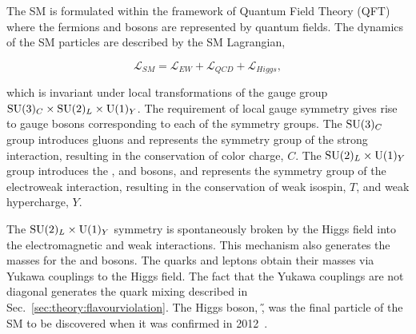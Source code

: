 The SM is formulated within the framework of Quantum Field Theory (QFT) where the fermions and bosons are represented by quantum fields. The dynamics of the SM particles are described by the SM Lagrangian,

\begin{equation}
\mathcal{L}_{SM} = \mathcal{L}_{EW} + \mathcal{L}_{QCD} + \mathcal{L}_{Higgs},
\end{equation}

\noindent which is invariant under local transformations of the gauge group ${\rm SU}(3)_{C} \times {\rm SU}(2)_{L} \times {\rm U}(1)_{Y}$. The requirement of local gauge symmetry gives rise to gauge bosons corresponding to each of the symmetry groups. The ${\rm SU}(3)_{C}$ group introduces gluons and represents the symmetry group of the strong interaction, resulting in the conservation of color charge, $C$. The ${\rm SU}(2)_{L} \times {\rm U}(1)_{Y}$ group introduces the \Wpm, \Z and \g bosons, and represents the symmetry group of the electroweak interaction, resulting in the conservation of weak isospin, $T$, and weak hypercharge, $Y$. 

The ${\rm SU}(2)_{L} \times {\rm U}(1)_{Y}$ symmetry is spontaneously broken by the Higgs field into the electromagnetic and weak interactions. This mechanism also generates the masses for the \Wpm and \Z bosons. The quarks and leptons obtain their masses via Yukawa couplings to the Higgs field. The fact that the Yukawa couplings are not diagonal generates the quark mixing described in Sec.~\ref{sec:theory:flavourviolation}. The Higgs boson, \H, was the final particle of the SM to be discovered when it was confirmed in 2012~\cite{higgs-atlas,higgs-cms}.




